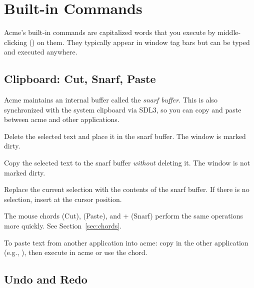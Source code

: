 \chapter{Built-in Commands}
\label{ch:commands}


Acme's built-in commands are capitalized words that you execute by
middle-clicking () on them.  They typically appear in window
tag bars but can be typed and executed anywhere.

\section{Clipboard: Cut, Snarf, Paste}
\label{sec:clipboard}


Acme maintains an internal buffer called the \emph{snarf buffer}.  This
is also synchronized with the system clipboard via SDL3, so you can
copy and paste between acme and other applications.

\begin{description}[style=nextline]
\item[\cmd{Cut}]
Delete the selected text and place it in the snarf buffer.  The
window is marked dirty.

\item[\cmd{Snarf}]
Copy the selected text to the snarf buffer \emph{without} deleting
it.  The window is not marked dirty.

\item[\cmd{Paste}]
Replace the current selection with the contents of the snarf buffer.
If there is no selection, insert at the cursor position.
\end{description}

The mouse chords  (Cut),  (Paste), and
+ (Snarf) perform the same operations more
quickly.  See Section~\ref{sec:chords}.

To paste text from another application into acme: copy in the other
application (e.g., ), then execute  in acme or
use the  chord.

\section{Undo and Redo}
\label{sec:undo}


